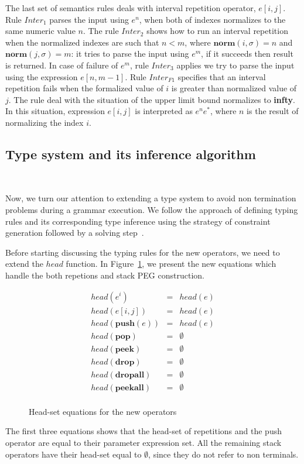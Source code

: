 \documentclass[sigplan,screen]{acmart}
\theoremstyle{definition}
\begin{document}
The last set of semantics rules deals with interval repetition operator,
$e[i,j]$. Rule $Inter_{1}$ parses the input using $e^n$, when both of indexes
normalizes to the same numeric value $n$. The rule $Inter_2$ shows how to run
an interval repetition when the normalized indexes are such that $n < m$,
where $\mathbf{norm}(i,\sigma) = n$ and $\mathbf{norm}(j,\sigma) = m$:
it tries to parse the input using $e^m$, if it succeeds then result is
returned. In case of failure of $e^m$, rule $Inter_3$ applies  we
try to parse the input using the expression $e[n, m -1]$.
Rule $Inter_{F1}$ specifies that an interval repetition fails when the formalized value of $i$
is greater than normalized value of $j$.
The rule deal with the situation of the upper limit bound normalizes to \textbf{infty}.
In this situation, expression $e[i,j]$ is interpreted as $e^n e^*$, where $n$ is the
result of normalizing the index $i$.

\subsection{Type system and its inference algorithm}~\label{sec:typesystem}

Now, we turn our attention to extending a type system to avoid
non termination problems during a grammar execution. We follow
the approach of defining typing rules and its corresponding
type inference using the strategy of constraint generation
followed by a solving step~\cite{Ribeiro19,Cardoso23, Pottier05}.

Before starting discussing the typing rules for the new operators,
we need to extend the $head$ function. In Figure~\ref{fig:new-head-set},
we present the new equations which handle the both repetions and stack
PEG construction.

\begin{figure}[H]
  \[
    \begin{array}{lcl}
      head(e^i) & = & head(e)\\
      head(e[i,j]) & = & head(e)\\
      head(\mathbf{push}(e)) & = & head(e)\\
      head(\mathbf{pop}) & = & \emptyset\\
      head(\mathbf{peek}) & = & \emptyset\\
      head(\mathbf{drop}) & = & \emptyset\\
      head(\mathbf{dropall}) & = & \emptyset\\
      head(\mathbf{peekall}) & = & \emptyset\\
    \end{array}
  \]
  \caption{Head-set equations for the new operators}
  \label{fig:new-head-set}
\end{figure}
The first three equations shows that the head-set of
repetitions and the push operator are equal to their
parameter expression set. All the remaining stack operators
have their head-set equal to $\emptyset$, since they do not
refer to non terminals.
\end{document}
